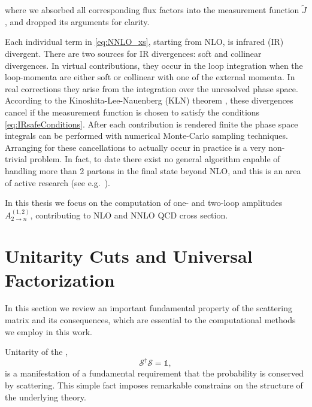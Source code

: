 where we absorbed all corresponding flux factors into the measurement function $\tilde{J}$, and dropped  its arguments for clarity. 

Each individual term in \cref{eq:NNLO_xs}, starting from NLO, is infrared (IR) divergent.
There are two sources for IR divergences: soft and collinear divergences.
In virtual contributions, they occur in the loop integration when the loop-momenta are
either soft or collinear with one of the external momenta.
In real corrections they arise from the integration over the unresolved phase space.
According to the Kinoshita-Lee-Nauenberg (KLN) theorem \cite{Kinoshita1962,Lee1964},
these divergences cancel if the measurement function is chosen to satisfy the conditions \eqref{eq:IRsafeConditions}.
After each contribution is rendered finite the phase space integrals can be performed with numerical Monte-Carlo sampling techniques.
Arranging for these cancellations to actually occur in practice is a very non-trivial problem.
In fact, to date there exist no general algorithm capable of handling more than 2 partons in the final state beyond NLO,
and this is an area of active research (see e.g.\ \cite{Catani:2007vq,Somogyi:2006da,Somogyi:2006cz,GehrmannDeRidder:2005cm,Gaunt:2015pea,Czakon:2010td,Czakon:2011ve,Anastasiou:2003gr}).

In this thesis we focus on the computation of one- and two-loop amplitudes $A^{(1,2)}_{2\to n}$, contributing
to NLO and NNLO QCD cross section.


\section{Unitarity Cuts and Universal Factorization}
\label{sec:unitarity}

In this section we review an important fundamental property of the scattering matrix and its consequences,
which are essential to the computational methods we employ in this work.

Unitarity of the \sma{},
\begin{equation} \label{eq:unitarity_smatrix}
  \mathcal{S}^\dagger \mathcal{S} = \mathbb{1},
\end{equation}
is a manifestation of a
fundamental requirement that the probability is conserved by scattering.
This simple fact imposes remarkable constrains on the structure of the underlying theory.

